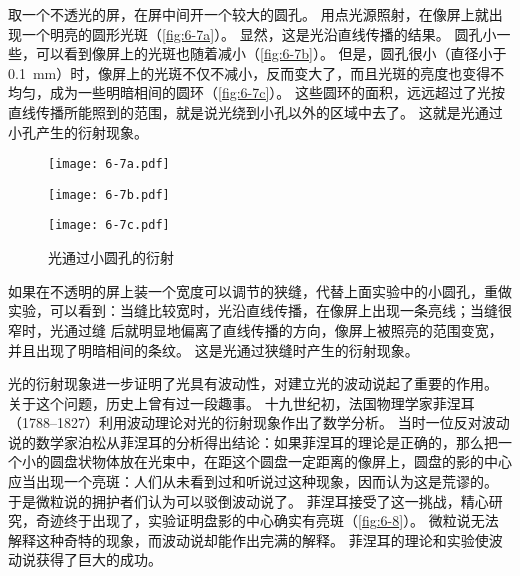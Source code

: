 取一个不透光的屏，在屏中间开一个较大的圆孔。
用点光源照射，在像屏上就出现一个明亮的圆形光斑（\cref{fig:6-7a}）。
显然，这是光沿直线传播的结果。
圆孔小一些，可以看到像屏上的光斑也随着减小（\cref{fig:6-7b}）。
但是，圆孔很小（直径小于 \qty{0.1}{mm}）时，像屏上的光斑不仅不减小，反而变大了，而且光斑的亮度也变得不均匀，成为一些明暗相间的圆环（\cref{fig:6-7c}）。
这些圆环的面积，远远超过了光按直线传播所能照到的范围，就是说光绕到小孔以外的区域中去了。
这就是光通过小孔产生的衍射现象。
\begin{figure}
  \begin{minipage}{0.1\linewidth}
    \subcaption{}\label{fig:6-7a}
  \end{minipage}%
  \begin{minipage}{0.65\linewidth}\centering
    \texttt{[image: 6-7a.pdf]}
  \end{minipage}\par
  \begin{minipage}{0.1\linewidth}
    \subcaption{}\label{fig:6-7b}
  \end{minipage}%
  \begin{minipage}{0.65\linewidth}\centering
    \texttt{[image: 6-7b.pdf]}
  \end{minipage}\par
  \begin{minipage}{0.1\linewidth}
    \subcaption{}\label{fig:6-7c}
  \end{minipage}%
  \begin{minipage}{0.65\linewidth}\centering
    \texttt{[image: 6-7c.pdf]}
  \end{minipage}\par
  \caption{光通过小圆孔的衍射}\label{fig:6-7}
\end{figure}

如果在不透明的屏上装一个宽度可以调节的狭缝，代替上面实验中的小圆孔，重做实验，可以看到：当缝比较宽时，光沿直线传播，在像屏上出现一条亮线；当缝很窄时，光通过缝
后就明显地偏离了直线传播的方向，像屏上被照亮的范围变宽，并且出现了明暗相间的条纹。
这是光通过狭缝时产生的衍射现象。

光的衍射现象进一步证明了光具有波动性，对建立光的波动说起了重要的作用。
关于这个问题，历史上曾有过一段趣事。
十九世纪初，法国物理学家菲涅耳（1788--1827）利用波动理论对光的衍射现象作出了数学分析。
当时一位反对波动说的数学家泊松从菲涅耳的分析得出结论：如果菲涅耳的理论是正确的，那么把一个小的圆盘状物体放在光束中，在距这个圆盘一定距离的像屏上，圆盘的影的中心应当出现一个亮斑：人们从未看到过和听说过这种现象，因而认为这是荒谬的。
于是微粒说的拥护者们认为可以驳倒波动说了。
菲涅耳接受了这一挑战，精心研究，奇迹终于出现了，实验证明盘影的中心确实有亮斑（\cref{fig:6-8}）。
微粒说无法解释这种奇特的现象，而波动说却能作出完满的解释。
菲涅耳的理论和实验使波动说获得了巨大的成功。

